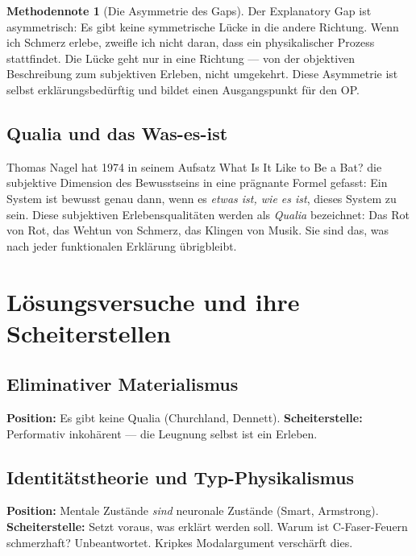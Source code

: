 \documentclass[11pt,a4paper]{article}
\theoremstyle{plain}
\theoremstyle{definition}
\newtheorem{methodennote}{Methodennote}[section]
\begin{document}
\begin{methodennote}[Die Asymmetrie des Gaps]
Der Explanatory Gap ist asymmetrisch: Es gibt keine symmetrische L\"{u}cke in die andere
Richtung. Wenn ich Schmerz erlebe, zweifle ich nicht daran, dass ein physikalischer
Prozess stattfindet. Die L\"{u}cke geht nur in eine Richtung --- von der objektiven
Beschreibung zum subjektiven Erleben, nicht umgekehrt. Diese Asymmetrie ist selbst
erkl\"{a}rungsbed\"{u}rftig und bildet einen Ausgangspunkt f\"{u}r den OP.
\end{methodennote}

\subsection{Qualia und das \glqq{}Was-es-ist\grqq{}}

Thomas Nagel hat 1974 in seinem Aufsatz \glqq{}What Is It Like to Be a Bat?\grqq{} die
subjektive Dimension des Bewusstseins in eine pr\"{a}gnante Formel gefasst: Ein System
ist bewusst genau dann, wenn es \emph{etwas ist, wie es ist}, dieses System zu sein.
Diese subjektiven Erlebensqualit\"{a}ten werden als \emph{Qualia} bezeichnet: Das Rot von
Rot, das Wehtun von Schmerz, das Klingen von Musik. Sie sind das, was nach jeder
funktionalen Erkl\"{a}rung \"{u}brigbleibt.

\section{L\"{o}sungsversuche und ihre Scheiterstellen}

\subsection{Eliminativer Materialismus}
\textbf{Position:} Es gibt keine Qualia (Churchland, Dennett).
\textbf{Scheiterstelle:} Performativ inkoh\"{a}rent --- die Leugnung selbst ist ein
Erleben.

\subsection{Identit\"{a}tstheorie und Typ-Physikalismus}
\textbf{Position:} Mentale Zust\"{a}nde \emph{sind} neuronale Zust\"{a}nde (Smart,
Armstrong).
\textbf{Scheiterstelle:} Setzt voraus, was erkl\"{a}rt werden soll. Warum ist
C-Faser-Feuern schmerzhaft? Unbeantwortet. Kripkes Modalargument versch\"{a}rft dies.
\end{document}
